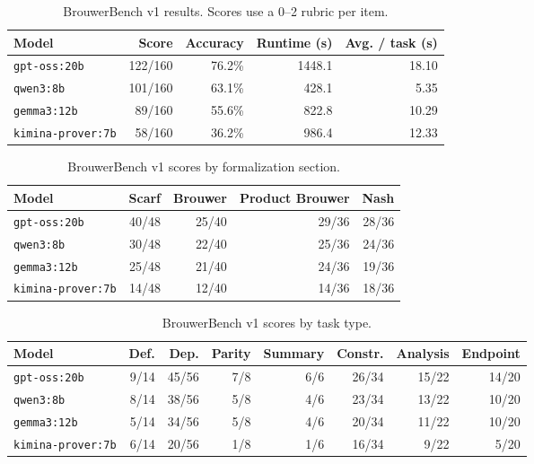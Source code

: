 \begin{table}[t]
\centering
\caption{BrouwerBench v1 results. Scores use a 0--2 rubric per item.}
\label{tab:brouwerbench-v1-models}
\begin{tabular}{lrrrr}
\hline
Model & Score & Accuracy & Runtime (s) & Avg. / task (s) \\
\hline
\texttt{gpt-oss:20b} & 122/160 & 76.2\% & 1448.1 & 18.10 \\
\texttt{qwen3:8b} & 101/160 & 63.1\% & 428.1 & 5.35 \\
\texttt{gemma3:12b} & 89/160 & 55.6\% & 822.8 & 10.29 \\
\texttt{kimina-prover:7b} & 58/160 & 36.2\% & 986.4 & 12.33 \\
\hline
\end{tabular}
\end{table}

\begin{table}[t]
\centering
\caption{BrouwerBench v1 scores by formalization section.}
\label{tab:brouwerbench-v1-sections}
\begin{tabular}{lrrrr}
\hline
Model & Scarf & Brouwer & Product Brouwer & Nash \\
\hline
\texttt{gpt-oss:20b} & 40/48 & 25/40 & 29/36 & 28/36 \\
\texttt{qwen3:8b} & 30/48 & 22/40 & 25/36 & 24/36 \\
\texttt{gemma3:12b} & 25/48 & 21/40 & 24/36 & 19/36 \\
\texttt{kimina-prover:7b} & 14/48 & 12/40 & 14/36 & 18/36 \\
\hline
\end{tabular}
\end{table}

\begin{table}[t]
\centering
\caption{BrouwerBench v1 scores by task type.}
\label{tab:brouwerbench-v1-task-types}
\begin{tabular}{lrrrrrrr}
\hline
Model & Def. & Dep. & Parity & Summary & Constr. & Analysis & Endpoint \\
\hline
\texttt{gpt-oss:20b} & 9/14 & 45/56 & 7/8 & 6/6 & 26/34 & 15/22 & 14/20 \\
\texttt{qwen3:8b} & 8/14 & 38/56 & 5/8 & 4/6 & 23/34 & 13/22 & 10/20 \\
\texttt{gemma3:12b} & 5/14 & 34/56 & 5/8 & 4/6 & 20/34 & 11/22 & 10/20 \\
\texttt{kimina-prover:7b} & 6/14 & 20/56 & 1/8 & 1/6 & 16/34 & 9/22 & 5/20 \\
\hline
\end{tabular}
\end{table}
